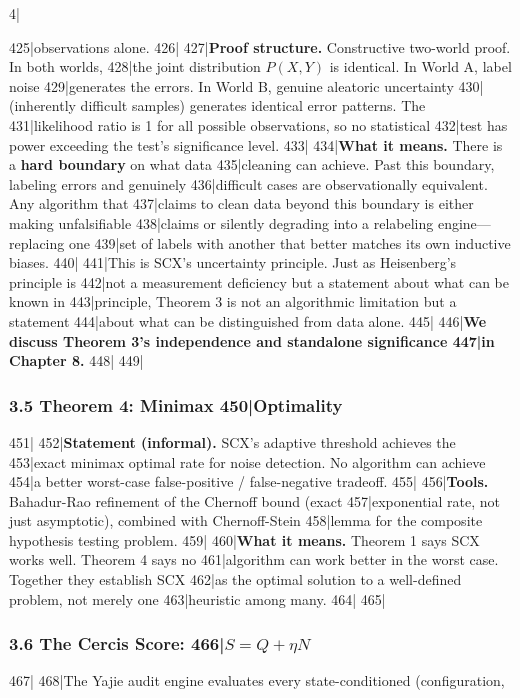 4|\documentclass[
5|  12pt,
6|]{article}
\begin{document}
425|observations alone.
426|
427|\textbf{Proof structure.} Constructive two-world proof. In both worlds,
428|the joint distribution \(P(X, Y)\) is identical. In World A, label noise
429|generates the errors. In World B, genuine aleatoric uncertainty
430|(inherently difficult samples) generates identical error patterns. The
431|likelihood ratio is 1 for all possible observations, so no statistical
432|test has power exceeding the test's significance level.
433|
434|\textbf{What it means.} There is a \textbf{hard boundary} on what data
435|cleaning can achieve. Past this boundary, labeling errors and genuinely
436|difficult cases are observationally equivalent. Any algorithm that
437|claims to clean data beyond this boundary is either making unfalsifiable
438|claims or silently degrading into a relabeling engine---replacing one
439|set of labels with another that better matches its own inductive biases.
440|
441|This is SCX's uncertainty principle. Just as Heisenberg's principle is
442|not a measurement deficiency but a statement about what can be known in
443|principle, Theorem 3 is not an algorithmic limitation but a statement
444|about what can be distinguished from data alone.
445|
446|\textbf{We discuss Theorem 3's independence and standalone significance
447|in Chapter 8.}
448|
449|\subsubsection{3.5 Theorem 4: Minimax
450|Optimality}\label{theorem-4-minimax-optimality}
451|
452|\textbf{Statement (informal).} SCX's adaptive threshold achieves the
453|exact minimax optimal rate for noise detection. No algorithm can achieve
454|a better worst-case false-positive / false-negative tradeoff.
455|
456|\textbf{Tools.} Bahadur-Rao refinement of the Chernoff bound (exact
457|exponential rate, not just asymptotic), combined with Chernoff-Stein
458|lemma for the composite hypothesis testing problem.
459|
460|\textbf{What it means.} Theorem 1 says SCX works well. Theorem 4 says no
461|algorithm can work better in the worst case. Together they establish SCX
462|as the optimal solution to a well-defined problem, not merely one
463|heuristic among many.
464|
465|\subsubsection{\texorpdfstring{3.6 The Cercis Score:
466|\(S = Q + \eta N\)}{3.6 The Cercis Score: S = Q + \textbackslash eta N}}\label{the-cercis-score-s-q-eta-n}
467|
468|The Yajie audit engine evaluates every state-conditioned (configuration,
\end{document}
